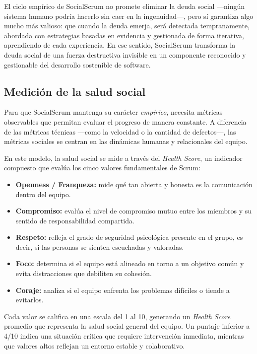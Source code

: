 El ciclo empírico de SocialScrum no promete eliminar la deuda social —ningún sistema humano podría hacerlo sin caer en la ingenuidad—, pero sí garantiza algo mucho más valioso: que cuando la deuda emerja, será detectada tempranamente, abordada con estrategias basadas en evidencia y gestionada de forma iterativa, aprendiendo de cada experiencia.
En ese sentido, SocialScrum transforma la deuda social de una fuerza destructiva invisible en un componente reconocido y gestionable del desarrollo sostenible de software.

\subsection{Medición de la salud social}

Para que SocialScrum mantenga su carácter \textit{empírico}, necesita métricas observables que permitan evaluar el progreso de manera constante. A diferencia de las métricas técnicas —como la velocidad o la cantidad de defectos—, las métricas sociales se centran en las dinámicas humanas y relacionales del equipo.

En este modelo, la salud social se mide a través del \textit{Health Score}, un indicador compuesto que evalúa los cinco valores fundamentales de Scrum:

\begin{itemize}
    \item \textbf{Openness / Franqueza:} mide qué tan abierta y honesta es la comunicación dentro del equipo.
    \item \textbf{Compromiso:} evalúa el nivel de compromiso mutuo entre los miembros y su sentido de responsabilidad compartida.
    \item \textbf{Respeto:} refleja el grado de seguridad psicológica presente en el grupo, es decir, si las personas se sienten escuchadas y valoradas.
    \item \textbf{Foco:} determina si el equipo está alineado en torno a un objetivo común y evita distracciones que debiliten su cohesión.
    \item \textbf{Coraje:} analiza si el equipo enfrenta los problemas difíciles o tiende a evitarlos.
\end{itemize}

Cada valor se califica en una escala del 1 al 10, generando un \textit{Health Score} promedio que representa la salud social general del equipo.
Un puntaje inferior a 4/10 indica una situación crítica que requiere intervención inmediata, mientras que valores altos reflejan un entorno estable y colaborativo.

